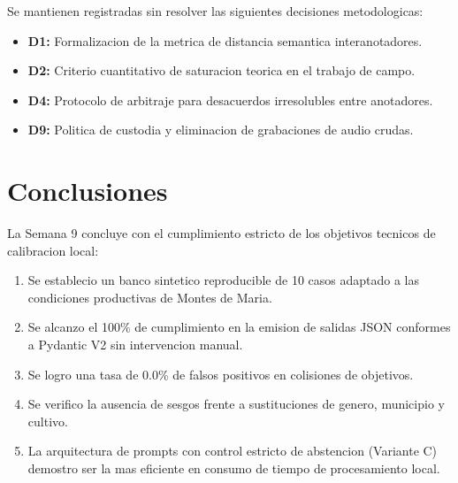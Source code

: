 \documentclass[11pt,a4paper]{article}
\begin{document}
Se mantienen registradas sin resolver las siguientes decisiones metodologicas:
\begin{itemize}[itemsep=2pt]
    \item \textbf{D1:} Formalizacion de la metrica de distancia semantica interanotadores.
    \item \textbf{D2:} Criterio cuantitativo de saturacion teorica en el trabajo de campo.
    \item \textbf{D4:} Protocolo de arbitraje para desacuerdos irresolubles entre anotadores.
    \item \textbf{D9:} Politica de custodia y eliminacion de grabaciones de audio crudas.
\end{itemize}

\section{Conclusiones}

La Semana 9 concluye con el cumplimiento estricto de los objetivos tecnicos de calibracion local:
\begin{enumerate}[itemsep=2pt]
    \item Se establecio un banco sintetico reproducible de 10 casos adaptado a las condiciones productivas de Montes de Maria.
    \item Se alcanzo el 100\% de cumplimiento en la emision de salidas JSON conformes a Pydantic V2 sin intervencion manual.
    \item Se logro una tasa de 0.0\% de falsos positivos en colisiones de objetivos.
    \item Se verifico la ausencia de sesgos frente a sustituciones de genero, municipio y cultivo.
    \item La arquitectura de prompts con control estricto de abstencion (Variante C) demostro ser la mas eficiente en consumo de tiempo de procesamiento local.
\end{enumerate}
\end{document}
